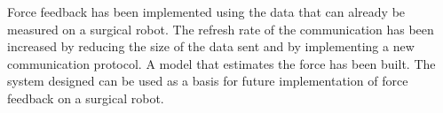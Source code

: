  Force feedback has been implemented using the data that can already be measured on a surgical robot. The refresh rate of the communication has been increased by reducing the size of the data sent and by implementing a new communication protocol. A model that estimates the force has been built. The system designed can be used as a basis for future implementation of force feedback on a surgical robot.